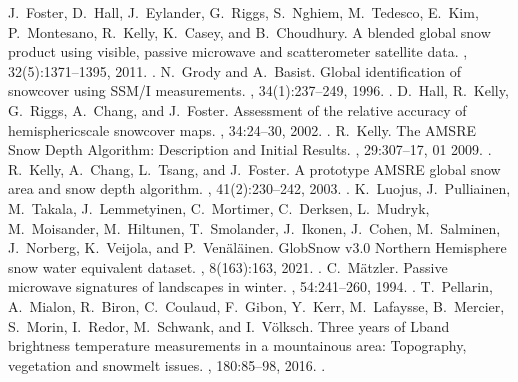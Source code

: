 \documentclass[letterpaper,10pt,english]{jupyterBook}
\begin{document}
\begin{sphinxthebibliography}{10}
J. Foster, D. Hall, J. Eylander, G. Riggs, S. Nghiem, M. Tedesco, E. Kim, P. Montesano, R. Kelly, K. Casey, and B. Choudhury. A blended global snow product using visible, passive microwave and scatterometer satellite data. , 32(5):1371–1395, 2011. .
\sphinxAtStartPar
N. Grody and A. Basist. Global identification of snowcover using SSM/I measurements. , 34(1):237–249, 1996. .
\sphinxAtStartPar
D. Hall, R. Kelly, G. Riggs, A. Chang, and J. Foster. Assessment of the relative accuracy of hemispheric\sphinxhyphen{}scale snow\sphinxhyphen{}cover maps. , 34:24–30, 2002. .
\sphinxAtStartPar
R. Kelly. The AMSR\sphinxhyphen{}E Snow Depth Algorithm: Description and Initial Results. , 29:307–17, 01 2009. .
\sphinxAtStartPar
R. Kelly, A. Chang, L. Tsang, and J. Foster. A prototype AMSR\sphinxhyphen{}E global snow area and snow depth algorithm. , 41(2):230–242, 2003. .
\sphinxAtStartPar
K. Luojus, J. Pulliainen, M. Takala, J. Lemmetyinen, C. Mortimer, C. Derksen, L. Mudryk, M. Moisander, M. Hiltunen, T. Smolander, J. Ikonen, J. Cohen, M. Salminen, J. Norberg, K. Veijola, and P. Venäläinen. GlobSnow v3.0 Northern Hemisphere snow water equivalent dataset. , 8(163):163, 2021. .
\sphinxAtStartPar
C. Mätzler. Passive microwave signatures of landscapes in winter. , 54:241–260, 1994. .
\sphinxAtStartPar
T. Pellarin, A. Mialon, R. Biron, C. Coulaud, F. Gibon, Y. Kerr, M. Lafaysse, B. Mercier, S. Morin, I. Redor, M. Schwank, and I. Völksch. Three years of L\sphinxhyphen{}band brightness temperature measurements in a mountainous area: Topography, vegetation and snowmelt issues. , 180:85–98, 2016. .

\end{sphinxthebibliography}
\end{document}
